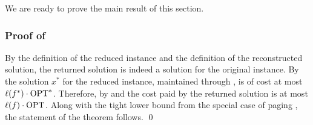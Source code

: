 \documentclass[11pt]{article}
\newcommand{\OPT}{\textnormal{OPT}}
\begin{document}
{%


We are ready to prove the main result of this section. 
\subsubsection*{Proof of }
By the definition of the reduced instance and the definition of the reconstructed solution, the returned solution is indeed a solution for the original instance. By  the solution $x^*$ for the reduced instance, maintained through , is of cost at most $\ell(f^*) \cdot \OPT^*$. Therefore, by  and  the cost paid by the returned solution is at most $\ell(f) \cdot \OPT$. 
Along with the tight lower bound from the special case of paging \cite{sleator1985amortized}, the statement of the theorem follows. %
\qed


}



\end{document}
